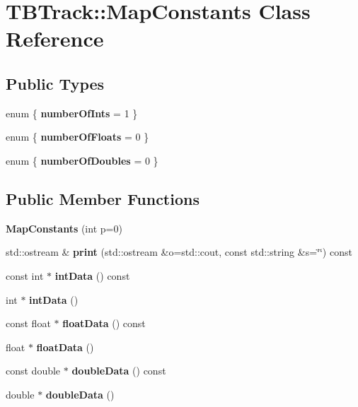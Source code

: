 \section{TBTrack::MapConstants Class Reference}
\label{classTBTrack_1_1MapConstants}
\subsection*{Public Types}
\begin{DoxyCompactItemize}
\item 
enum \{ {\bfseries numberOfInts} = 1
 \}
\item 
enum \{ {\bfseries numberOfFloats} = 0
 \}
\item 
enum \{ {\bfseries numberOfDoubles} = 0
 \}
\end{DoxyCompactItemize}
\subsection*{Public Member Functions}
\begin{DoxyCompactItemize}
\item 
{\bfseries MapConstants} (int p=0)\label{classTBTrack_1_1MapConstants_ad6a908a71ad6e73996a27429b7ba4485}

\item 
std::ostream \& {\bfseries print} (std::ostream \&o=std::cout, const std::string \&s=\char`\"{}\char`\"{}) const \label{classTBTrack_1_1MapConstants_abf0ecdc32902053ca7bacf7ab68d6166}

\item 
const int $\ast$ {\bfseries intData} () const \label{classTBTrack_1_1MapConstants_aeaffabb97fe13e54bca6a2ccfcf5dcf4}

\item 
int $\ast$ {\bfseries intData} ()\label{classTBTrack_1_1MapConstants_a64090ab098d7b42996eb37ac0181c6d9}

\item 
const float $\ast$ {\bfseries floatData} () const \label{classTBTrack_1_1MapConstants_a5db3dc38042fe8bc9fd1346eddbf2b43}

\item 
float $\ast$ {\bfseries floatData} ()\label{classTBTrack_1_1MapConstants_a25791641151a9a929d1cc7d9cb080976}

\item 
const double $\ast$ {\bfseries doubleData} () const \label{classTBTrack_1_1MapConstants_a2dc86123f3989ad6f8e633aacec4c918}

\item 
double $\ast$ {\bfseries doubleData} ()\label{classTBTrack_1_1MapConstants_a0b3f2db804b686ebd71e35d718564853}

\end{DoxyCompactItemize}
